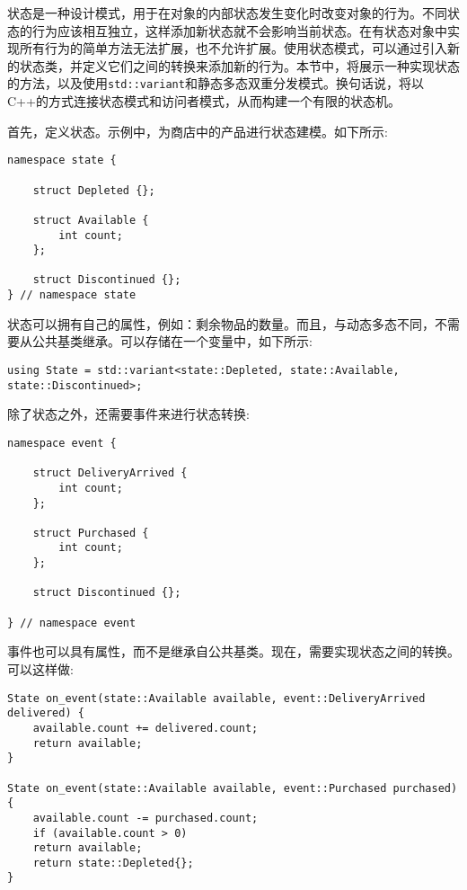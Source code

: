 状态是一种设计模式，用于在对象的内部状态发生变化时改变对象的行为。不同状态的行为应该相互独立，这样添加新状态就不会影响当前状态。在有状态对象中实现所有行为的简单方法无法扩展，也不允许扩展。使用状态模式，可以通过引入新的状态类，并定义它们之间的转换来添加新的行为。本节中，将展示一种实现状态的方法，以及使用\texttt{std::variant}和静态多态双重分发模式。换句话说，将以C++的方式连接状态模式和访问者模式，从而构建一个有限的状态机。

首先，定义状态。示例中，为商店中的产品进行状态建模。如下所示:

\begin{lstlisting}[style=styleCXX]
namespace state {
	
	struct Depleted {};
	
	struct Available {
		int count;
	};

	struct Discontinued {};
} // namespace state
\end{lstlisting}

状态可以拥有自己的属性，例如：剩余物品的数量。而且，与动态多态不同，不需要从公共基类继承。可以存储在一个变量中，如下所示:

\begin{lstlisting}[style=styleCXX]
using State = std::variant<state::Depleted, state::Available,
state::Discontinued>;
\end{lstlisting}

除了状态之外，还需要事件来进行状态转换:

\begin{lstlisting}[style=styleCXX]
namespace event {
	
	struct DeliveryArrived {
		int count;
	};

	struct Purchased {
		int count;
	};

	struct Discontinued {};
	
} // namespace event
\end{lstlisting}

事件也可以具有属性，而不是继承自公共基类。现在，需要实现状态之间的转换。可以这样做:

\begin{lstlisting}[style=styleCXX]
State on_event(state::Available available, event::DeliveryArrived
delivered) {
	available.count += delivered.count;
	return available;
}

State on_event(state::Available available, event::Purchased purchased) {
	available.count -= purchased.count;
	if (available.count > 0)
	return available;
	return state::Depleted{};
}
\end{lstlisting}

